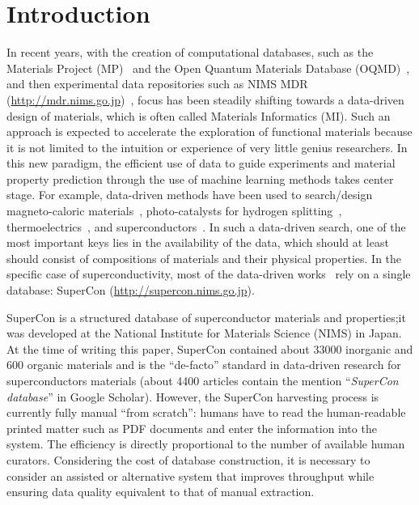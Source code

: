 \documentclass[]{interact}
\theoremstyle{plain}%
\theoremstyle{definition}
\theoremstyle{remark}
\begin{document}
\section{Introduction}
In recent years, with the creation of computational databases, such as the Materials Project (MP)~\cite{materialsprojectJain2013} and the Open Quantum Materials Database (OQMD)~\cite{oqmdkirklin2015open}, and then experimental data repositories such as NIMS MDR (\url{http://mdr.nims.go.jp})~\cite{ranganathan_anusha_2019_3553963}, focus has been steadily shifting towards a data-driven design of materials, which is often called Materials Informatics (MI).
Such an approach is expected to accelerate the exploration of functional materials because it is not limited to the intuition or experience of very little genius researchers.
In this new paradigm, the efficient use of data to guide experiments and material property prediction through the use of machine learning methods takes center stage.
For example, data-driven methods have been used to search/design magneto-caloric materials~\cite{Bocarsly2017,Castro2020-12,court2021inverse}, photo-catalysts for hydrogen splitting~\cite{xiong2021optimizing}, thermoelectrics~\cite{iwasaki2019machine}, and superconductors~\cite{stanev_machine_2017}.
In such a data-driven search, one of the most important keys lies in the availability of the data, which should at least should consist of compositions of materials and their physical properties.
In the specific case of superconductivity, most of the data-driven works~\cite{stanev_machine_2017, le2020critical,Hamlin2019SuperconductivityNR} rely on a single database: SuperCon (\url{http://supercon.nims.go.jp}).

SuperCon is a structured database of superconductor materials and properties;it was developed at the National Institute for Materials Science (NIMS) in Japan.
At the time of writing this paper, SuperCon contained about 33000 inorganic and 600 organic materials and is the ``de-facto'' standard in data-driven research for superconductors materials (about 4400 articles contain the mention ``\textit{SuperCon database}'' in Google Scholar).
However, the SuperCon harvesting process is currently fully manual ``from scratch'': humans have to read the human-readable printed matter such as PDF documents and enter the information into the system.
The efficiency is directly proportional to the number of available human curators.
Considering the cost of database construction, it is necessary to consider an assisted or alternative system that improves throughput while ensuring data quality equivalent to that of manual extraction.
\end{document}
